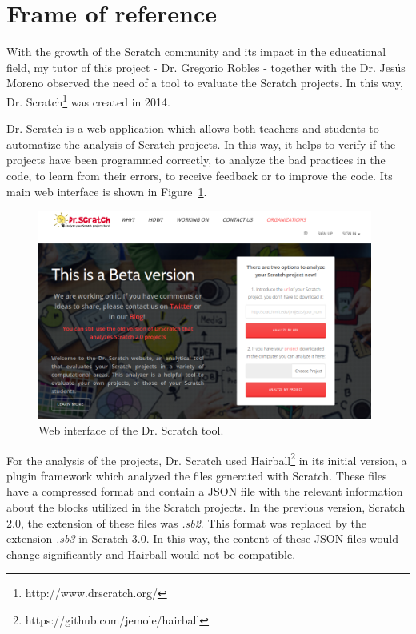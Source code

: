 \section{Frame of reference}
\label{sec:reference}

With the growth of the Scratch community and its impact in the educational field, my tutor of this project - Dr. Gregorio Robles - together with the Dr. Jesús Moreno observed the need of a tool to evaluate the Scratch projects. In this way, Dr. Scratch\footnote{http://www.drscratch.org/} was created in 2014.

Dr. Scratch is a web application which allows both teachers and students to automatize the analysis of Scratch projects. In this way, it helps to verify if the projects have been programmed correctly, to analyze the bad practices in the code, to learn from their errors, to receive feedback or to improve the code. Its main web interface is shown in Figure~\ref{fig:dr_scratch}.

\begin{figure}
  \centering
  \includegraphics[width=11cm, keepaspectratio]{img/dr_scratch.png}
  \caption{Web interface of the Dr. Scratch tool.}
  \label{fig:dr_scratch}
\end{figure}

For the analysis of the projects, Dr. Scratch used Hairball\footnote{https://github.com/jemole/hairball} in its initial version, a plugin framework which analyzed the files generated with Scratch. These files have a compressed format and contain a JSON file with the relevant information about the blocks utilized in the Scratch projects. In the previous version, Scratch 2.0, the extension of these files was \textit{.sb2}. This format was replaced by the extension \textit{.sb3} in Scratch 3.0. In this way, the content of these JSON files would change significantly and Hairball would not be compatible.

